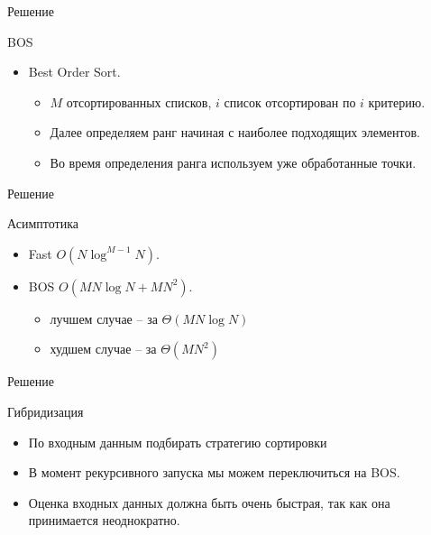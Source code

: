 \documentclass{beamer}
\begin{document}
\begin{frame}{Решение}
\begin{block}{BOS}
\begin{center}
\end{center}
\begin{itemize}
\item Best Order Sort.
\begin{itemize}
\item $M$ отсортированных списков, $i$ список отсортирован по $i$ критерию. 
\item Далее определяем ранг начиная с наиболее подходящих элементов. 
\item Во время определения ранга используем уже обработанные точки.
\end{itemize}
\end{itemize}
\end{block}
\end{frame}


\begin{frame}{Решение}
\begin{block}{Асимптотика}
\begin{itemize}
\item Fast $O(N \log^{M-1}N)$.
\item BOS $O(MN \log N + MN^2)$.
\begin{itemize}
\item лучшем случае -- за $\Theta(MN\log{N})$
\item худшем случае -- за $\Theta(MN^2)$
\end{itemize}

\end{itemize}
\end{block}
\end{frame}


\begin{frame}{Решение}
\begin{block}{Гибридизация}
\begin{itemize}
\item По входным данным подбирать стратегию сортировки
\item В момент рекурсивного запуска мы можем переключиться на BOS. 
\item Оценка входных данных должна быть очень быстрая, так как она принимается неоднократно.
\end{itemize}
\end{block}
\end{frame}
\end{document}
